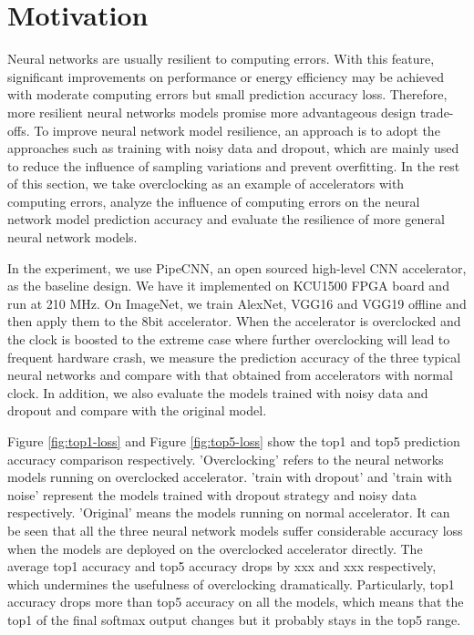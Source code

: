 \section{Motivation} \label{sec:motivation}
Neural networks are usually resilient to computing errors. With this feature, 
significant improvements on performance or energy efficiency may be 
achieved with moderate computing errors but small prediction accuracy loss.
Therefore, more resilient neural networks models promise more advantageous 
design trade-offs. To improve neural network model resilience, an  approach is to adopt 
the approaches such as training with noisy data and dropout, which are mainly 
used to reduce the influence of sampling variations and prevent overfitting. 
In the rest of this section, we take overclocking as an example of accelerators 
with computing errors, analyze the influence of computing errors on 
the neural network model prediction accuracy and evaluate the resilience of 
more general neural network models.

In the experiment, we use PipeCNN\cite{pipecnn_2}, an open sourced high-level CNN accelerator, 
as the baseline design. We have it implemented on KCU1500 FPGA board and run at 210 MHz. 
On ImageNet, we train AlexNet, VGG16 and VGG19 offline and then apply them to the 8bit accelerator. 
When the accelerator is overclocked and the clock is boosted to the extreme case where 
further overclocking will lead to frequent hardware crash, we measure the prediction accuracy of 
the three typical neural networks and compare with that obtained from accelerators with normal 
clock. In addition, we also evaluate the models trained with noisy data and dropout and 
compare with the original model.

Figure \ref{fig:top1-loss} and Figure \ref{fig:top5-loss} show the top1 and top5 prediction accuracy comparison 
respectively. 'Overclocking' refers to the neural networks models running on overclocked accelerator. 
'train with dropout' and 'train with noise' represent the models trained with dropout strategy 
and noisy data respectively. 'Original' means the models running on normal accelerator.
It can be seen that all the three neural network models suffer considerable accuracy loss 
when the models are deployed on the overclocked accelerator directly. The average top1 accuracy and top5 accuracy 
drops by xxx and xxx respectively, which undermines the usefulness of overclocking dramatically.
Particularly, top1 accuracy drops more than top5 accuracy on all the 
models, which means that the top1 of the final softmax output changes but it probably 
stays in the top5 range. 

